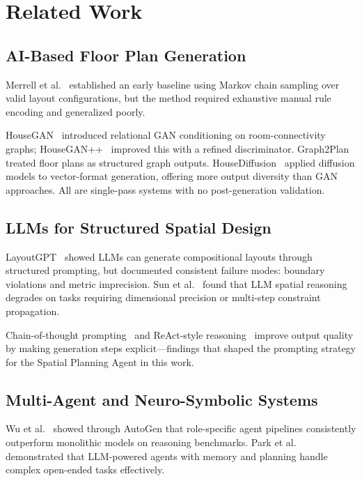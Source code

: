 \documentclass[journal]{IEEEtran}
\begin{document}
\section{Related Work}

\subsection{AI-Based Floor Plan Generation}

Merrell et al.~\cite{b2} established an early baseline using Markov chain
sampling over valid layout configurations, but the method required exhaustive
manual rule encoding and generalized poorly.

HouseGAN~\cite{b3} introduced relational GAN conditioning on room-connectivity
graphs; HouseGAN++~\cite{b12} improved this with a refined discriminator.
Graph2Plan~\cite{b13} treated floor plans as structured graph outputs.
HouseDiffusion~\cite{b4} applied diffusion models to vector-format generation,
offering more output diversity than GAN approaches. All are single-pass
systems with no post-generation validation.

\subsection{LLMs for Structured Spatial Design}

LayoutGPT~\cite{b7} showed LLMs can generate compositional layouts through
structured prompting, but documented consistent failure modes: boundary
violations and metric imprecision. Sun et al.~\cite{b14} found that LLM
spatial reasoning degrades on tasks requiring dimensional precision or
multi-step constraint propagation.

Chain-of-thought prompting~\cite{b15} and ReAct-style reasoning~\cite{b16}
improve output quality by making generation steps explicit---findings that
shaped the prompting strategy for the Spatial Planning Agent in this work.

\subsection{Multi-Agent and Neuro-Symbolic Systems}

Wu et al.~\cite{b8} showed through AutoGen that role-specific agent pipelines
consistently outperform monolithic models on reasoning benchmarks. Park
et al.~\cite{b17} demonstrated that LLM-powered agents with memory and
planning handle complex open-ended tasks effectively.
\end{document}
